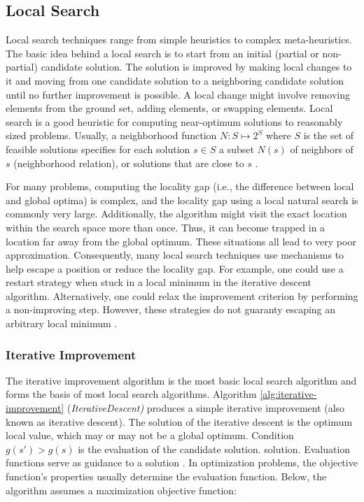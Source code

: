 \subsection{Local Search}
Local search techniques range from simple heuristics to complex meta-heuristics. The basic idea behind a local search is to start from an initial (partial or non-partial) \gls{candidate solution}. The solution is improved by making local changes to it and moving from one \gls{candidate solution} to a neighboring \gls{candidate solution} until no further improvement is possible. A local change might involve removing elements from the ground set, adding elements, or swapping elements. Local search is a good heuristic for computing near-optimum solutions to reasonably sized problems. Usually, a neighborhood function $N: S \mapsto 2^S$ where $S $ is the set of feasible solutions specifies for each solution $s \in S$ a subset $N(s)$ of neighbors of $s$ (neighborhood relation), or solutions that are close to $s$ \parencite{Gonzalez2007HandbookMetaheuristics}.

For many problems, computing the locality gap (i.e., the difference between local and global optima) is complex, and the locality gap using a local natural search is commonly very large. Additionally, the algorithm might visit the exact location within the search space more than once. Thus, it can become trapped in a location far away from the global optimum. These situations all lead to very poor approximation. Consequently, many local search techniques use mechanisms to help escape a position or reduce the locality gap. For example, one could use a restart strategy when stuck in a local minimum in the iterative descent algorithm. Alternatively, one could relax the improvement criterion by performing a non-improving step. However, these strategies do not guaranty escaping an arbitrary local minimum \parencite{HolgerH2005StochasticSearch}.


\subsubsection{Iterative Improvement}
The iterative improvement algorithm is the most basic local search algorithm and forms the basis of most local search algorithms. Algorithm \ref{alg:iterative-improvement} (\textit{IterativeDescent)} produces a simple iterative improvement (also known as iterative descent). The solution of the iterative descent is the optimum local value, which may or may not be a global optimum. Condition $g(s') > g(s)$ is the evaluation of the candidate solution. solution. Evaluation functions serve as guidance to a solution \parencite{HolgerH2005StochasticSearch}. In optimization problems, the objective function’s properties usually determine the evaluation function. Below, the algorithm assumes a maximization objective function:

